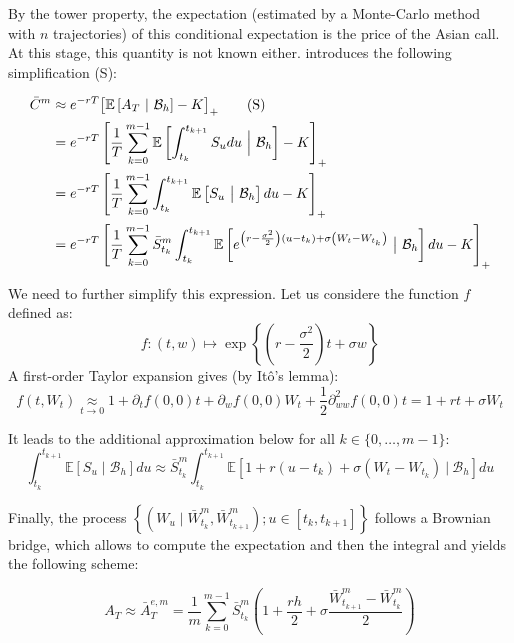 \documentclass{article}
\begin{document}
By the tower property, the expectation (estimated by a Monte-Carlo method with $n$ trajectories)
of this conditional expectation is the price of the Asian call.
At this stage, this quantity is not known either. \cite{main} introduces the following simplification (S):

\begin{align}
	\bar C^m &\approx e^{-rT}  \bigl[ \mathbb E \left[A_T
		\ \vert \ \mathcal B_h \right] - K \bigr]_+
	\tag{S} \\
	&= e^{-rT} \left[ \frac{1}{T}\sum_{k=0}^{m-1} \mathbb E \left[ \int_{t_k}^{t_{k+1}} S_u du
		\ \Big\vert \ \mathcal B_h \right] - K \right]_+
	\notag \\
	&= e^{-rT} \left[ \frac{1}{T}\sum_{k=0}^{m-1} \int_{t_k}^{t_{k+1}} \mathbb E \left[ S_u
		\ \big\vert \ \mathcal B_h \right] du - K \right]_+
	\notag \\
	&= e^{-rT} \left[ \frac{1}{T}\sum_{k=0}^{m-1} \bar S_{t_k}^m \int_{t_k}^{t_{k+1}}
		\mathbb E \left[ e^{\left( r - \frac{\sigma^2}{2} \right) (u - t_k) + \sigma \left( W_t - W_{t_k} \right)}
		\ \big\vert \ \mathcal B_h \right] du - K \right]_+
	\notag
\end{align}

We need to further simplify this expression. Let us considere the function $f$ defined as:
\[
	f : (t, w) \mapsto \exp \left\{ \left( r - \frac{\sigma^2}{2} \right) t + \sigma w \right\}
\]
A first-order Taylor expansion gives (by It\^o's lemma):
\[
	f(t, W_t) \underset{t \to 0}{\approx} 1 + \partial_t f(0, 0) t + \partial_w f(0, 0) W_t
	+ \frac{1}{2} \partial_{ww}^2 f (0, 0) t = 1 + rt + \sigma W_t
\]

It leads to the additional approximation below for all $k \in \{ 0, \dots, m - 1 \}$:
\[
	\int_{t_k}^{t_{k+1}} \mathbb E \left[ S_u \mid \mathcal B_h \right] du
	\approx \bar S_{t_k}^m \int_{t_k}^{t_{k+1}}
		\mathbb E \left[ 1 + r (u - t_k) + \sigma \left( W_t - W_{t_k} \right)
		\ \big\vert \ \mathcal B_h \right] du
\]

Finally, the process
$\left\{ \left( W_u \mid \bar W_{t_k}^m, \bar W_{t_{k+1}}^m \right) ; u \in [t_k, t_{k + 1}] \right\}$
follows a Brownian bridge, which allows
to compute the expectation and then the integral and yields the following scheme:

\begin{equation}
    A_T \approx \bar A_T^{e, m} = \frac{1}{m} \sum_{k=0}^{m-1} \bar S_{t_k}^m
    	\left( 1 + \frac{rh}{2} + \sigma \frac{\bar W_{t_{k+1}}^m - \bar W_{t_k}^m}{2} \right) \tag{2}
\end{equation}
\end{document}
